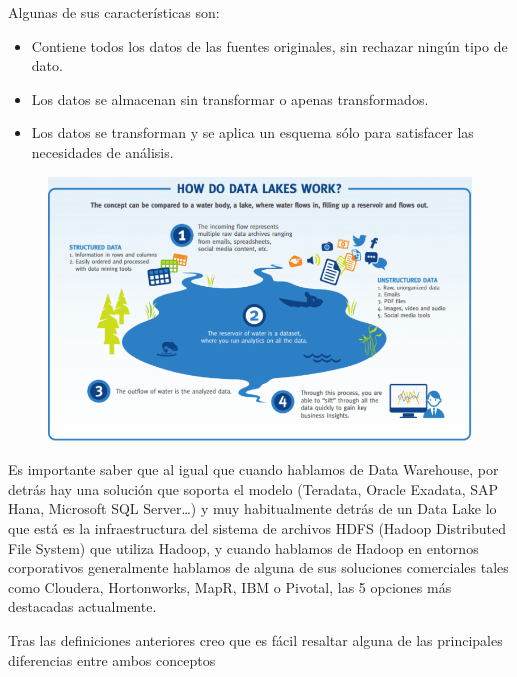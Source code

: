 \documentclass[preprint,12pt]{elsarticle}
\begin{document}
Algunas de sus características son:

\begin{itemize}
	
\item Contiene todos los datos de las fuentes originales, sin rechazar ningún tipo de dato.
\item Los datos se almacenan sin transformar o apenas transformados.
\item Los datos se transforman y se aplica un esquema sólo para satisfacer las necesidades de análisis.

\end{itemize}

\begin{figure}[htb]
				\begin{center}
					\includegraphics[width=15cm]{./IMAGENES/fiorella2}
				\end{center}
			\end{figure}

Es importante saber que al igual que cuando hablamos de Data Warehouse, por detrás hay una solución que soporta el modelo (Teradata, Oracle Exadata, SAP Hana, Microsoft SQL Server…) y muy habitualmente detrás de un Data Lake lo que está es la infraestructura del sistema de archivos HDFS (Hadoop Distributed File System) que utiliza Hadoop, y cuando hablamos de Hadoop en entornos corporativos generalmente hablamos de alguna de sus soluciones comerciales tales como Cloudera, Hortonworks, MapR, IBM o Pivotal, las 5 opciones más destacadas actualmente.

Tras las definiciones anteriores creo que es fácil resaltar alguna de las principales diferencias entre ambos conceptos
\end{document}
